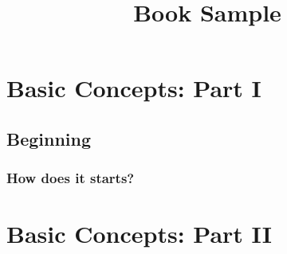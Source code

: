 \documentclass[twoside,a4paper,10pt]{book}
\title{Book Sample}
\begin{document}
\maketitle
\tableofcontents %

\part{Basic Concepts: Part I}
\chapter{Beginning}
\section{How does it starts?}

\part{Basic Concepts: Part II}
\end{document}
